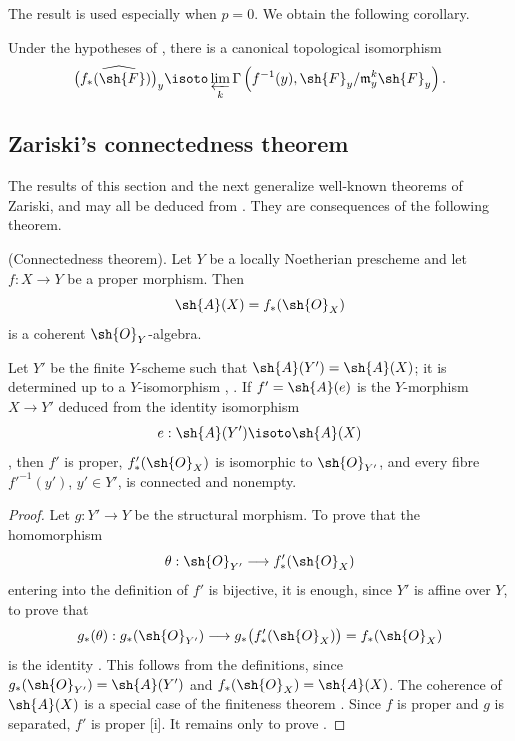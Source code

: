 \begin{env}[4.2.3]
\label{III.4.2.3}
The result  is used especially when $p=0$.
We obtain the following corollary.
\end{env}

\begin{corollary}[4.2.4]
\label{III.4.2.4}
Under the hypotheses of , there is a canonical
topological isomorphism
\[
  \widehat{\bigl(f_*(\sh{F})\bigr)_y}
  \isoto
  \varprojlim_k
  \Gamma\left(
    f^{-1}(y),
    \sh{F}_y/\mathfrak{m}_y^k\sh{F}_y
  \right).
\]
\end{corollary}


\subsection{Zariski's connectedness theorem}
\label{subsection:III.4.3}
\label{III.4.3}

The results of this section and the next generalize well-known
theorems of Zariski, and may all be deduced from
.  They are consequences of the following theorem.

\begin{theorem}[4.3.1]
\label{III.4.3.1}
\textnormal{(Connectedness theorem).}
Let $Y$ be a locally Noetherian prescheme and let $f:X\to Y$ be a
proper morphism.  Then
\[
  \sh{A}(X)=f_*(\sh{O}_X)
\]
is a coherent $\sh{O}_Y$-algebra.


Let $Y'$ be the finite $Y$-scheme such that
$\sh{A}(Y')=\sh{A}(X)$; it is determined up to a $Y$-isomorphism
, .
If $f'=\sh{A}(e)$ is the $Y$-morphism $X\to Y'$ deduced from the
identity isomorphism
\[
  e:\sh{A}(Y')\isoto\sh{A}(X)
\]
, then $f'$ is proper,
$f'_*(\sh{O}_X)$ is isomorphic to $\sh{O}_{Y'}$, and every fibre
$f'^{-1}(y')$, $y'\in Y'$, is connected and nonempty.
\end{theorem}

\begin{proof}
Let $g:Y'\to Y$ be the structural morphism.  To prove that the
homomorphism
\[
  \theta:\sh{O}_{Y'}\longrightarrow f'_*(\sh{O}_X)
\]
entering into the definition of $f'$ is bijective, it is enough,
since $Y'$ is affine over $Y$, to prove that
\[
  g_*(\theta):
  g_*(\sh{O}_{Y'})
  \longrightarrow
  g_*\bigl(f'_*(\sh{O}_X)\bigr)
  =
  f_*(\sh{O}_X)
\]
is the identity .  This follows from the
definitions, since
$g_*(\sh{O}_{Y'})=\sh{A}(Y')$ and
$f_*(\sh{O}_X)=\sh{A}(X)$.
The coherence of $\sh{A}(X)$ is a special case of the finiteness
theorem .  Since $f$ is proper and $g$ is separated,
$f'$ is proper [i].  It remains only to prove
.
\end{proof}

